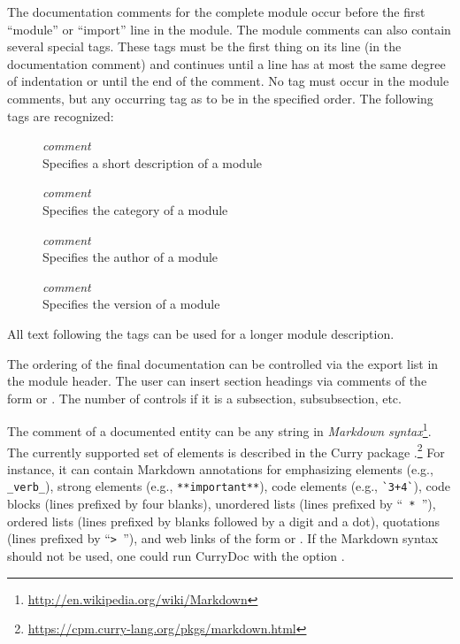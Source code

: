 The documentation comments for the complete module occur before
the first ``module'' or ``import'' line in the module.
The module comments can also contain several special tags. These tags
must be the first thing on its line (in the documentation comment)
and continues until a line has at most the same degree of indentation or
until the end of the comment.
No tag must occur in the module comments, but any
occurring tag as to be in the specified order.
The following tags are recognized:
\begin{description}
\item[] \emph{comment}\\
Specifies a short description of a module
\item[] \emph{comment}\\
Specifies the category of a module
\item[] \emph{comment}\\
Specifies the author of a module
\item[] \emph{comment}\\
Specifies the version of a module
\end{description}
All text following the tags can be used for a longer module description.

The ordering of the final documentation can be controlled via the export list
in the module header.
The user can insert section headings via comments of the form \ccode{-{}- *} or
\ccode{\{- * }. The number of \ccode{*} controls if it is a subsection,
subsubsection, etc.

The comment of a documented entity can be any string in
\emph{Markdown syntax}\footnote{%
\url{http://en.wikipedia.org/wiki/Markdown}}.
The currently supported set of elements is described in the
Curry package .\footnote{%
\url{https://cpm.curry-lang.org/pkgs/markdown.html}}
For instance, it can contain Markdown annotations for
emphasizing elements (e.g., \verb!_verb_!),
strong elements (e.g., \verb!**important**!),
code elements (e.g., \verb!`3+4`!), code blocks (lines prefixed by four blanks),
unordered lists (lines prefixed by  ``\verb! * !''),
ordered lists (lines prefixed by blanks followed by a digit and a dot),
quotations (lines prefixed by ``\verb!> !''),
and web links of the form 
or .
If the Markdown syntax should not be used, one could run CurryDoc
with the option .


